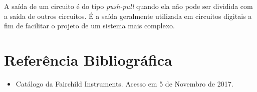 \documentclass[12pt, a4paper, twoside]{article}
\begin{document}
A saída de um circuito é do tipo \textit{push-pull} quando ela não pode ser dividida com a saída de outros circuitos. É a saída geralmente utilizada em circuitos digitais a fim de facilitar o projeto de um sistema mais complexo.

\section{Referência Bibliográfica}

\begin{itemize}
    \item Catálogo da Fairchild Instruments. Acesso em 5 de Novembro de 2017.
\end{itemize}
\end{document}
